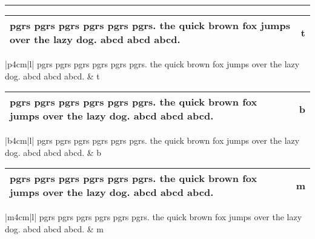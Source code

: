 \documentclass{article}
\begin{document}
\hrule\bigskip

\START

\begin{tabular}{|p{4cm}|l|}
\hline
pgrs pgrs pgrs pgrs pgrs pgrs. the quick brown fox jumps over the lazy dog. abcd abcd abcd. & t \\
\hline
\end{tabular}
\begin{tblr}{|p{4cm}|l|}
\hline
pgrs pgrs pgrs pgrs pgrs pgrs. the quick brown fox jumps over the lazy dog. abcd abcd abcd. & t \\
\hline
\end{tblr}
\par\smallskip
\begin{tabular}{|b{4cm}|l|}
\hline
pgrs pgrs pgrs pgrs pgrs pgrs. the quick brown fox jumps over the lazy dog. abcd abcd abcd. & b \\
\hline
\end{tabular}
\begin{tblr}{|b{4cm}|l|}
\hline
pgrs pgrs pgrs pgrs pgrs pgrs. the quick brown fox jumps over the lazy dog. abcd abcd abcd. & b \\
\hline
\end{tblr}
\par\smallskip
\begin{tabular}{|m{4cm}|l|}
\hline
pgrs pgrs pgrs pgrs pgrs pgrs. the quick brown fox jumps over the lazy dog. abcd abcd abcd. & m \\
\hline
\end{tabular}
\begin{tblr}{|m{4cm}|l|}
\hline
pgrs pgrs pgrs pgrs pgrs pgrs. the quick brown fox jumps over the lazy dog. abcd abcd abcd. & m \\
\hline
\end{tblr}
\ENDTEST
\end{document}

